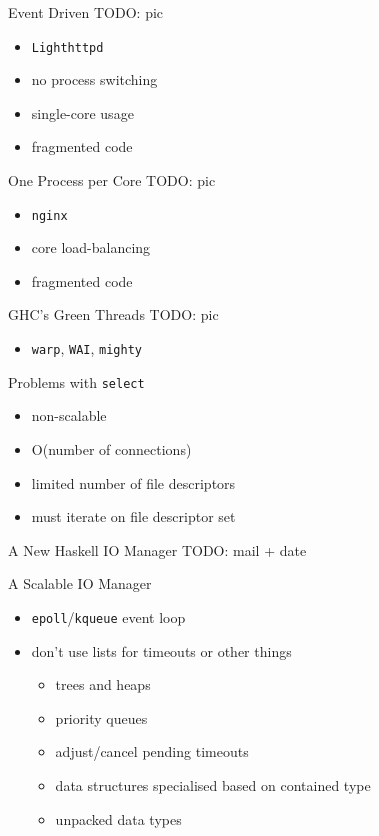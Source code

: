 \documentclass{beamer}
\begin{document}
\begin{frame}{Event Driven}
  TODO: pic
  \begin{itemize}
    \item \texttt{Lighthttpd}
    \pause
    \item no process switching
    \pause
    \item single-core usage
    \item fragmented code
  \end{itemize}
\end{frame}

\begin{frame}{One Process per Core}
  TODO: pic
  \begin{itemize}
    \item \texttt{nginx}
    \pause
    \item core load-balancing
    \pause
    \item fragmented code
  \end{itemize}
\end{frame}

\begin{frame}{GHC's Green Threads}
  TODO: pic
  \begin{itemize}
    \item \texttt{warp}, \texttt{WAI}, \texttt{mighty}
  \end{itemize}
\end{frame}

\begin{frame}{Problems with \texttt{select}}
  \begin{itemize}[<+->]
    \item non-scalable
    \item O(number of connections)
    \item limited number of file descriptors
    \item must iterate on file descriptor set
  \end{itemize}
\end{frame}

\begin{frame}{A New Haskell IO Manager}
  TODO: mail + date
\end{frame}

\begin{frame}{A Scalable IO Manager}
  \begin{itemize}
    \item \texttt{epoll}/\texttt{kqueue} event loop
    \item don't use lists for timeouts or other things
    \begin{itemize}[<+->]
      \item trees and heaps
      \item priority queues
      \item adjust/cancel pending timeouts
      \item data structures specialised based on contained type
      \item unpacked data types
    \end{itemize}
  \end{itemize}
\end{frame}
\end{document}

